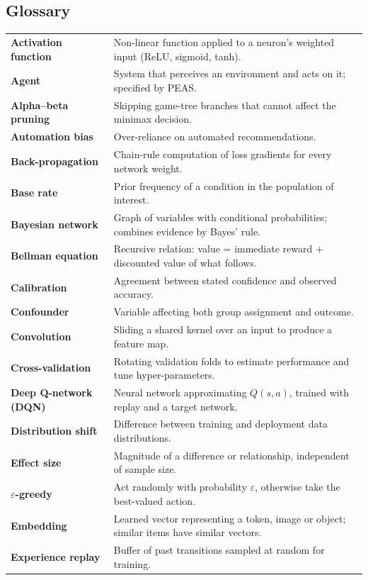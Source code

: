 \documentclass[11pt]{article}
\begin{document}
\subsection{Glossary}
{\small\renewcommand{\arraystretch}{1.2}
\begin{longtable}{>{\bfseries}p{3.6cm}p{11.4cm}}\toprule
Activation function & Non-linear function applied to a neuron's weighted input (ReLU, sigmoid, tanh).\\
Agent & System that perceives an environment and acts on it; specified by PEAS.\\
Alpha--beta pruning & Skipping game-tree branches that cannot affect the minimax decision.\\
Automation bias & Over-reliance on automated recommendations.\\
Back-propagation & Chain-rule computation of loss gradients for every network weight.\\
Base rate & Prior frequency of a condition in the population of interest.\\
Bayesian network & Graph of variables with conditional probabilities; combines evidence by Bayes' rule.\\
Bellman equation & Recursive relation: value = immediate reward + discounted value of what follows.\\
Calibration & Agreement between stated confidence and observed accuracy.\\
Confounder & Variable affecting both group assignment and outcome.\\
Convolution & Sliding a shared kernel over an input to produce a feature map.\\
Cross-validation & Rotating validation folds to estimate performance and tune hyper-parameters.\\
Deep Q-network (DQN) & Neural network approximating $Q(s,a)$, trained with replay and a target network.\\
Distribution shift & Difference between training and deployment data distributions.\\
Effect size & Magnitude of a difference or relationship, independent of sample size.\\
$\varepsilon$-greedy & Act randomly with probability $\varepsilon$, otherwise take the best-valued action.\\
Embedding & Learned vector representing a token, image or object; similar items have similar vectors.\\
Experience replay & Buffer of past transitions sampled at random for training.\\

\end{longtable}}
\end{document}
